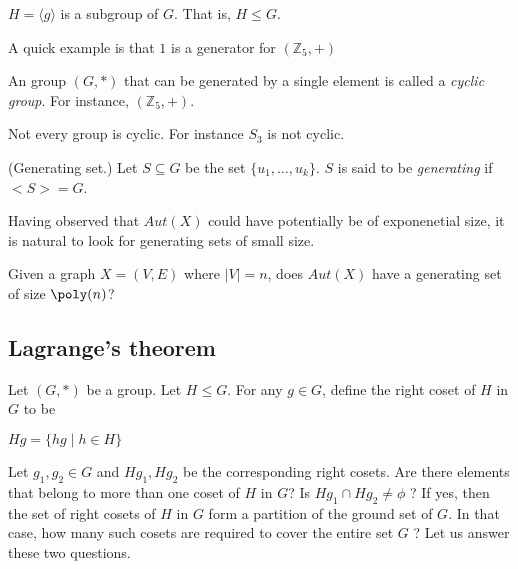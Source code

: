 \begin{observation}$H = \langle g \rangle$ is a subgroup of $G$. That is, $H\leq G$.
\end{observation}

A quick example is that $1$ is a generator for $(\mathbb{Z}_5,+)$



\begin{definition}
An group $(G,*)$ that can be generated by a single element is called a {\em cyclic group}. For instance, $(\mathbb{Z}_5,+)$.
\end{definition}

Not every group is cyclic. For instance $S_3$ is not cyclic.



\begin{definition}(Generating set.)
Let $S\subseteq G$ be the set $\{u_1,\ldots,u_k\}$. $S$ is said to be {\em generating} if $<S>=G$.  
\end{definition}

Having observed that $Aut(X)$ could have potentially be of exponenetial size, it is natural to look for generating sets of small size.

Given a graph $X=(V,E)$ where $|V|=n$, does $Aut(X)$ have a generating set of size $\poly(n)$?

\subsection{Lagrange's theorem}

Let $(G,*)$ be a group. Let $H\leq G$. For any $g\in G$, define the right coset of $H$ in $G$ to be
\begin{center}
$Hg= \{hg \mid h\in H \}$
\end{center}
 

Let $g_1,g_2\in G$ and $Hg_1,Hg_2$ be the corresponding right cosets.  Are there elements that belong to more than one coset of $H$ in $G$? Is $Hg_1\cap Hg_2 \neq \phi$ ? If yes, then the set of right cosets of $H$ in $G$ form a partition of the ground set of $G$. In that case, how many such cosets are required to cover the entire set $G$ ? Let us answer these two questions.

